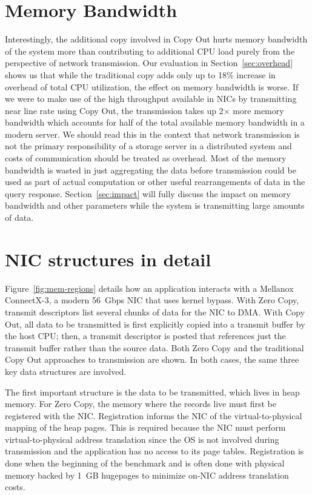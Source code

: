 \section{Memory Bandwidth}
Interestingly, the additional copy involved in Copy Out hurts memory bandwidth of the system more than contributing 
to additional CPU load purely from the perspective of network transmission. Our evaluation in Section~\ref{sec:overhead} shows us that while the traditional
copy adds only up to 18\% increase in overhead of total CPU utilization, the effect on memory bandwidth is worse.
 If we were to make use of the high throughput available in NICs by transmitting near line rate using Copy Out, 
 the transmission takes up 2$\times$ more memory bandwidth which accounts for half of the total available memory bandwidth in a modern server.
  We should read this in the context that network transmission is not the primary responsibility of a storage server in a distributed system
   and costs of communication should be treated as overhead. Most of the memory bandwidth is wasted in just aggregating the data 
before transmission could be used as part of actual computation or other useful rearrangements of data in 
the query response. Section~\ref{sec:impact} will fully discuss the impact on memory bandwidth and other parameters while the system 
is transmitting large amounts of data.


\section{NIC structures in detail}
Figure~\ref{fig:mem-regions} details how an application interacts with a Mellanox
ConnectX-3\textregistered , a modern 56~Gbps NIC that uses kernel bypass. 
With Zero Copy, transmit descriptors list several chunks of data for
the NIC to DMA. With Copy Out, all data to be transmitted is first explicitly
copied into a transmit buffer by the host CPU; then, a transmit descriptor is
posted that references just the transmit buffer rather than the 
source data. Both Zero Copy and the traditional Copy Out approaches to transmission are shown.
In both cases, the same three key data structures are involved. 

The first important structure is the
data to be transmitted, which lives in heap memory. For Zero Copy, the memory
where the records live must first be registered with the NIC. Registration
informs the NIC of the virtual-to-physical mapping of the heap pages. This is
required because the NIC must perform virtual-to-physical address translation
since the OS is not involved during transmission and the application has no
access to its page tables. Registration is done when the beginning of the benchmark and is often
done with physical memory backed by 1~GB hugepages to minimize on-NIC address
translation costs.


